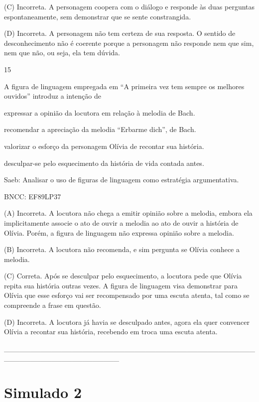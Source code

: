 (C) Incorreta. A personagem coopera com o diálogo e responde às duas
perguntas espontaneamente, sem demonstrar que se sente constrangida.

(D) Incorreta. A personagem não tem certeza de sua resposta. O sentido
de desconhecimento não é coerente porque a personagem não responde nem
que sim, nem que não, ou seja, ela tem dúvida.

\num{15}

A figura de linguagem empregada em ``A primeira vez tem sempre os
melhores ouvidos'' introduz a intenção de

\begin{escolha}
\item expressar a opinião da locutora em relação à melodia de Bach.

\item recomendar a apreciação da melodia ``Erbarme dich'', de Bach.

\item valorizar o esforço da personagem Olívia de recontar sua história.

\item desculpar-se pelo esquecimento da história de vida contada antes.
\end{escolha}

Saeb: Analisar o uso de figuras de linguagem como estratégia
argumentativa.

BNCC: EF89LP37

(A) Incorreta. A locutora não chega a emitir opinião sobre a melodia,
embora ela implicitamente associe o ato de ouvir a melodia ao ato de
ouvir a história de Olívia. Porém, a figura de linguagem não expressa
opinião sobre a melodia.

(B) Incorreta. A locutora não recomenda, e sim pergunta se Olívia
conhece a melodia.

(C) Correta. Após se desculpar pelo esquecimento, a locutora pede que
Olívia repita sua história outras vezes. A figura de linguagem visa
demonstrar para Olívia que esse esforço vai ser recompensado por uma
escuta atenta, tal como se compreende a frase em questão.

(D) Incorreta. A locutora já havia se desculpado antes, agora ela quer
convencer Olívia a recontar sua história, recebendo em troca uma escuta
atenta.

\_\_\_\_\_\_\_\_\_\_\_\_\_\_\_\_\_\_\_\_\_\_\_\_\_\_\_\_\_\_\_\_\_\_\_\_\_\_\_\_\_\_\_\_\_\_\_\_\_\_\_\_\_\_\_\_\_\_\_\_\_\_\_\_\_\_\_\_\_\_

\section{Simulado 2}

